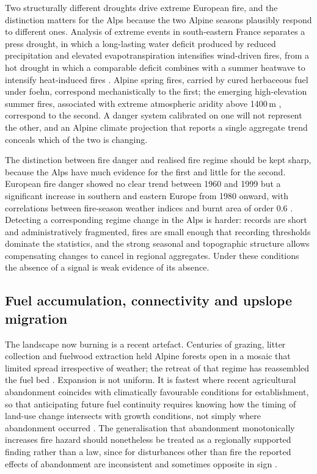 \documentclass[11pt,a4paper]{article}
\begin{document}
Two structurally different droughts drive extreme European fire, and the distinction matters for the Alps because the two Alpine seasons plausibly respond to different ones. Analysis of extreme events in south-eastern France separates a press drought, in which a long-lasting water deficit produced by reduced precipitation and elevated evapotranspiration intensifies wind-driven fires, from a hot drought in which a comparable deficit combines with a summer heatwave to intensify heat-induced fires \citep{ruffault_extreme_2018}. Alpine spring fires, carried by cured herbaceous fuel under foehn, correspond mechanistically to the first; the emerging high-elevation summer fires, associated with extreme atmospheric aridity above 1400\,m \citep{beloiu_climatedriven_2026}, correspond to the second. A danger system calibrated on one will not represent the other, and an Alpine climate projection that reports a single aggregate trend conceals which of the two is changing.

The distinction between fire danger and realised fire regime should be kept sharp, because the Alps have much evidence for the first and little for the second. European fire danger showed no clear trend between 1960 and 1999 but a significant increase in southern and eastern Europe from 1980 onward, with correlations between fire-season weather indices and burnt area of order 0.6 \citep{venalainen_temporal_2014}. Detecting a corresponding regime change in the Alps is harder: records are short and administratively fragmented, fires are small enough that recording thresholds dominate the statistics, and the strong seasonal and topographic structure allows compensating changes to cancel in regional aggregates. Under these conditions the absence of a signal is weak evidence of its absence.

\subsection{Fuel accumulation, connectivity and upslope migration}

The landscape now burning is a recent artefact. Centuries of grazing, litter collection and fuelwood extraction held Alpine forests open in a mosaic that limited spread irrespective of weather; the retreat of that regime has reassembled the fuel bed \citep{bebi_changes_2017}. Expansion is not uniform. It is fastest where recent agricultural abandonment coincides with climatically favourable conditions for establishment, so that anticipating future fuel continuity requires knowing how the timing of land-use change intersects with growth conditions, not simply where abandonment occurred \citep{garbarino_contrasting_2020}. The generalisation that abandonment monotonically increases fire hazard should nonetheless be treated as a regionally supported finding rather than a law, since for disturbances other than fire the reported effects of abandonment are inconsistent and sometimes opposite in sign \citep{mantero_influence_2020}.
\end{document}

